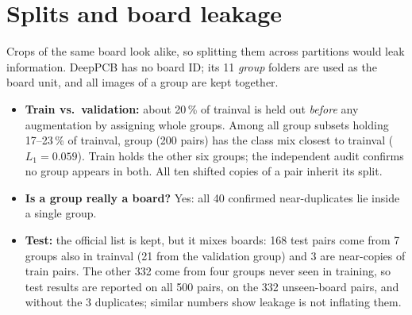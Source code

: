\documentclass[10pt,a4paper]{article}
\newcommand{\fn}[1]{\texttt{\detokenize{#1}}}
\begin{document}

\section{Splits and board leakage}
Crops of the same board look alike, so splitting them across partitions would leak information. DeepPCB has no
board ID; its 11 \emph{group} folders are used as the board unit, and all images of a group are kept together.
\begin{itemize}
\item \textbf{Train vs.\ validation:} about 20\,\% of trainval is held out \emph{before} any augmentation by
assigning whole groups. Among all group subsets holding 17--23\,\% of trainval, group \fn{00041} (200 pairs) has
the class mix closest to trainval ($L_1=0.059$). Train holds the other six groups; the independent audit confirms
no group appears in both. All ten shifted copies of a pair inherit its split.
\item \textbf{Is a group really a board?} Yes: all 40 confirmed near-duplicates lie inside a single group.
\item \textbf{Test:} the official list is kept, but it mixes boards: 168 test pairs come from 7 groups also in
trainval (21 from the validation group) and 3 are near-copies of train pairs. The other 332 come from four groups
never seen in training, so test results are reported on all 500 pairs, on the 332 unseen-board pairs, and without
the 3 duplicates; similar numbers show leakage is not inflating them.
\end{itemize}
\end{document}
